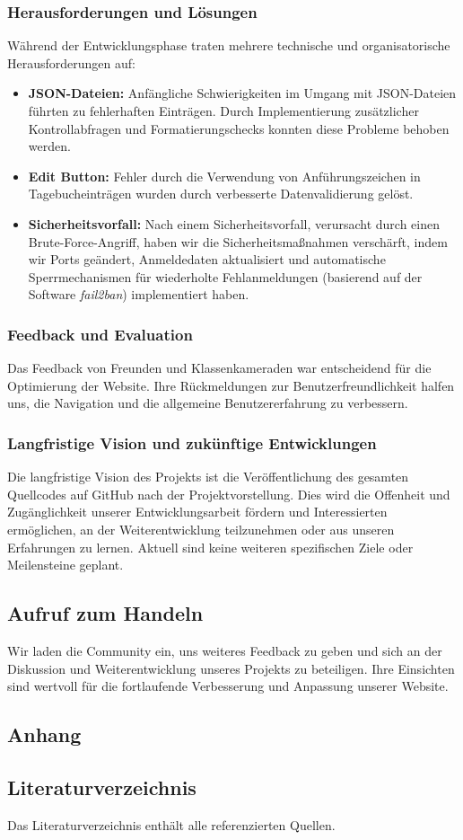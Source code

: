 \subsubsection{Herausforderungen und Lösungen}
Während der Entwicklungsphase traten mehrere technische und organisatorische Herausforderungen auf:
\begin{itemize}
    \item \textbf{JSON-Dateien:} Anfängliche Schwierigkeiten im Umgang mit JSON-Dateien führten zu fehlerhaften Einträgen. Durch Implementierung zusätzlicher Kontrollabfragen und Formatierungschecks konnten diese Probleme behoben werden.
    \item \textbf{Edit Button:} Fehler durch die Verwendung von Anführungszeichen in Tagebucheinträgen wurden durch verbesserte Datenvalidierung gelöst.
    \item \textbf{Sicherheitsvorfall:} Nach einem Sicherheitsvorfall, verursacht durch einen Brute-Force-Angriff, haben wir die Sicherheitsmaßnahmen verschärft, indem wir Ports geändert, Anmeldedaten aktualisiert und automatische Sperrmechanismen für wiederholte Fehlanmeldungen (basierend auf der Software \textit{fail2ban}) implementiert haben.
\end{itemize}

\subsubsection{Feedback und Evaluation}
Das Feedback von Freunden und Klassenkameraden war entscheidend für die Optimierung der Website. Ihre Rückmeldungen zur Benutzerfreundlichkeit halfen uns, die Navigation und die allgemeine Benutzererfahrung zu verbessern.

\subsubsection{Langfristige Vision und zukünftige Entwicklungen}
Die langfristige Vision des Projekts ist die Veröffentlichung des gesamten Quellcodes auf GitHub nach der Projektvorstellung. Dies wird die Offenheit und Zugänglichkeit unserer Entwicklungsarbeit fördern und Interessierten ermöglichen, an der Weiterentwicklung teilzunehmen oder aus unseren Erfahrungen zu lernen. Aktuell sind keine weiteren spezifischen Ziele oder Meilensteine geplant.

\subsection{Aufruf zum Handeln}
Wir laden die Community ein, uns weiteres Feedback zu geben und sich an der Diskussion und Weiterentwicklung unseres Projekts zu beteiligen. Ihre Einsichten sind wertvoll für die fortlaufende Verbesserung und Anpassung unserer Website.

\subsection{Anhang}


\subsection{Literaturverzeichnis}
Das Literaturverzeichnis enthält alle referenzierten Quellen.



